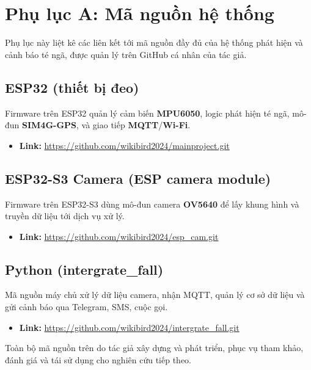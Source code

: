 
\chapter{Phụ lục A: Mã nguồn hệ thống}

Phụ lục này liệt kê các liên kết tới mã nguồn đầy đủ của hệ thống phát hiện và cảnh báo té ngã, được quản lý trên GitHub cá nhân của tác giả.

\section{ESP32 (thiết bị đeo)}
Firmware trên ESP32 quản lý cảm biến \textbf{MPU6050}, logic phát hiện té ngã, mô-đun \textbf{SIM4G-GPS}, và giao tiếp \textbf{MQTT}/\textbf{Wi-Fi}.
\begin{itemize}
    \item \textbf{Link:} \url{https://github.com/wikibird2024/mainproject.git}
\end{itemize}

\section{ESP32-S3 Camera (ESP camera module)}
Firmware trên ESP32-S3 dùng mô-đun camera \textbf{OV5640} để lấy khung hình và truyền dữ liệu tới dịch vụ xử lý.
\begin{itemize}
    \item \textbf{Link:} \url{https://github.com/wikibird2024/esp_cam.git}
\end{itemize}

\section{Python (intergrate\_fall)}
Mã nguồn máy chủ xử lý dữ liệu camera, nhận MQTT, quản lý cơ sở dữ liệu và gửi cảnh báo qua Telegram, SMS, cuộc gọi.
\begin{itemize}
    \item \textbf{Link:} \url{https://github.com/wikibird2024/intergrate_fall.git}
\end{itemize}

\vspace{1cm}
Toàn bộ mã nguồn trên do tác giả \TENTACGIA{} xây dựng và phát triển, phục vụ tham khảo, đánh giá và tái sử dụng cho nghiên cứu tiếp theo.
